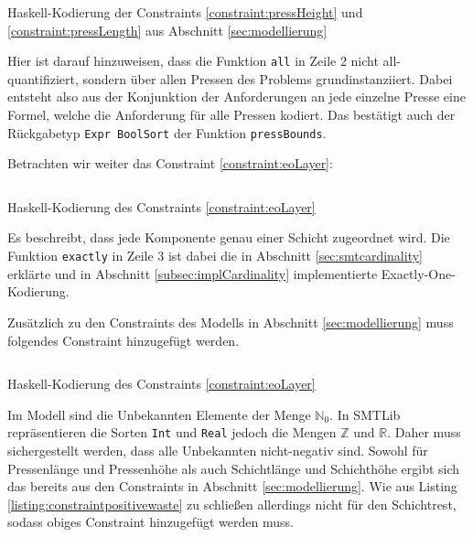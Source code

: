 \begin{listing}[H]
    \inputminted[linenos=true]{haskell}{Code/Implementierung/ConstraintPressenDimensionen.hs}
    \caption{Haskell-Kodierung der Constraints \ref{constraint:pressHeight} und \ref{constraint:pressLength} aus Abschnitt \ref{sec:modellierung}}
    \label{listing:constraintimplpressdim}
\end{listing}

Hier ist darauf hinzuweisen, dass die Funktion \texttt{all} in Zeile 2 nicht all-quantifiziert, sondern über allen Pressen des Problems grundinstanziiert.
Dabei entsteht also aus der Konjunktion der Anforderungen an jede einzelne Presse eine Formel, welche die Anforderung für alle Pressen kodiert.
Das bestätigt auch der Rückgabetyp \texttt{Expr BoolSort} der Funktion \texttt{pressBounds}.

Betrachten wir weiter das Constraint \ref{constraint:eoLayer}:

\begin{listing}[H]
    \inputminted[linenos=true]{haskell}{Code/Implementierung/ConstraintCompInAmoLayer.hs}
    \caption{Haskell-Kodierung des Constraints \ref{constraint:eoLayer}}
    \label{listing:constraintimplamolayer}
\end{listing}

Es beschreibt, dass jede Komponente genau einer Schicht zugeordnet wird.
Die Funktion \texttt{exactly} in Zeile 3 ist dabei die in Abschnitt \ref{sec:smtcardinality} erklärte und in Abschnitt \ref{subsec:implCardinality} implementierte
Exactly-One-Kodierung.

Zusätzlich zu den Constraints des Modells in Abschnitt \ref{sec:modellierung} muss folgendes Constraint hinzugefügt werden.

\begin{listing}[H]
    \inputminted[linenos=true]{haskell}{Code/Implementierung/ConstraintPositiveWaste.hs}
    \caption{Haskell-Kodierung des Constraints \ref{constraint:eoLayer}}
    \label{listing:constraintpositivewaste}
\end{listing}

Im Modell sind die Unbekannten Elemente der Menge $\mathbb{N}_0$.
In SMTLib repräsentieren die Sorten \texttt{Int} und \texttt{Real} jedoch die Mengen $\mathbb{Z}$ und $\mathbb{R}$.
Daher muss sichergestellt werden, dass alle Unbekannten nicht-negativ sind.
Sowohl für Pressenlänge und Pressenhöhe als auch Schichtlänge und Schichthöhe ergibt sich das bereits aus den Constraints in Abschnitt \ref{sec:modellierung}.
Wie aus Listing \ref{listing:constraintpositivewaste} zu schließen allerdings nicht für den Schichtrest, sodass obiges Constraint hinzugefügt werden muss.

